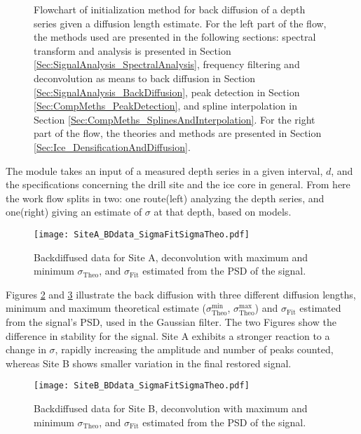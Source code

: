 \documentclass[../../CompleteThesis2/Complete_2ndDraft]{subfiles}
\begin{document}
\begin{figure}[!htb]
\begin{tikzpicture}[node distance=1.5cm, auto]
	\end{tikzpicture}
	\caption[Flowchart of initialization method]{\small Flowchart of initialization method for back diffusion of a depth series given a diffusion length estimate. For the left part of the flow, the methods used are presented in the following sections: spectral transform and analysis is presented in Section \ref{Sec:SignalAnalysis_SpectralAnalysis}, frequency filtering and deconvolution as means to back diffusion in Section \ref{Sec:SignalAnalysis_BackDiffusion}, peak detection in Section \ref{Sec:CompMeths_PeakDetection}, and spline interpolation in Section \ref{Sec:CompMeths_SplinesAndInterpolation}. For the right part of the flow, the theories and methods are presented in Section \ref{Sec:Ice_DensificationAndDiffusion}.}
	\label{Fig:FlowchartBackDiffusion}
\end{figure}

The module takes an input of a measured depth series in a given interval, $d$, and the specifications concerning the drill site and the ice core in general. From here the work flow splits in two: one route(left) analyzing the depth series, and one(right) giving an estimate of $\sigma$ at that depth, based on models.

\begin{figure}[!htb]
	\centering
	\texttt{[image: SiteA\_BDdata\_SigmaFitSigmaTheo.pdf]}
	\caption[Deconvolution with $\sigma_{\text{Theo}}$ and $\sigma_{\text{Fit}}$, Site A]{\small Backdiffused data for Site A, deconvolution with maximum and minimum $\sigma_{\text{Theo}}$, and $\sigma_{\text{Fit}}$ estimated from the PSD of the signal.}
	\label{Fig:SiteA_BDdata_SigmaFitSigmaTheo}
\end{figure}

Figures \ref{Fig:SiteA_BDdata_SigmaFitSigmaTheo} and \ref{Fig:SiteB_BDdata_SigmaFitSigmaTheo} illustrate the back diffusion with three different diffusion lengths, minimum and maximum theoretical estimate ($\sigma_{\text{Theo}}^{\text{min}}$, $\sigma_{\text{Theo}}^{\text{max}}$) and $\sigma_{\text{Fit}}$ estimated from the signal's PSD, used in the Gaussian filter. The two Figures show the difference in stability for the signal. Site A exhibits a stronger reaction to a change in $\sigma$, rapidly increasing the amplitude and number of peaks counted, whereas Site B shows smaller variation in the final restored signal.

\begin{figure}[!htb]
	\centering
	\texttt{[image: SiteB\_BDdata\_SigmaFitSigmaTheo.pdf]}
	\caption[Deconvolution with $\sigma_{\text{Theo}}$ and $\sigma_{\text{Fit}}$, Site B]{\small Backdiffused data for Site B, deconvolution with maximum and minimum $\sigma_{\text{Theo}}$, and $\sigma_{\text{Fit}}$ estimated from the PSD of the signal.}
	\label{Fig:SiteB_BDdata_SigmaFitSigmaTheo}
\end{figure}
\end{document}
